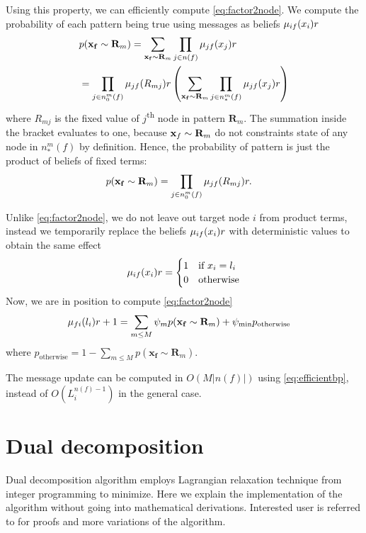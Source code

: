 \documentclass[letterpaper, 10 pt, conference]{ieeeconf} %
\newcommand{\vect}[1]{\mathbf{#1}}
\begin{document}
Using this property, we can efficiently compute \eqref{eq:factor2node}. We
compute the probability of each pattern being true using messages as beliefs
$\msg{i}{f}{x_i}{r}$
\begin{align}
  &p(\vect{x_f} \sim \vect{R}_m) = \sum_{\vect{x_f} \sim \vect{R}_m} \prod_{j \in n(f)}\msg{j}{f}{x_j}{r}\\
  &= \prod_{j \in n^m_0(f)}\msg{j}{f}{R_{mj}}{r}\left(\sum_{\vect{x_f} \sim \vect{R}_m}\prod_{j \in n^m_*(f)}\msg{j}{f}{x_j}{r}\right)
\end{align}
where $R_{mj}$ is the fixed value of $j$\textsuperscript{th} node in pattern
$\vect{R}_m$. The summation inside the bracket evaluates to one, because
$\map_f \sim \vect{R}_m$ do not constraints state of any node in $n^m_*(f)$
by definition. Hence, the probability of pattern is just the product of beliefs
of fixed terms:
\begin{align}
  p(\vect{x_f} \sim \vect{R}_m)&= \prod_{j \in n^m_0(f)}\msg{j}{f}{R_{mj}}{r}.
\end{align}

Unlike \eqref{eq:factor2node}, we do not leave out target node
$i$ from product terms, instead we temporarily replace the beliefs
$\msg{i}{f}{x_i}{r}$ with deterministic values to obtain the same effect
\begin{align}
  \msg{i}{f}{x_i}{r} = \begin{cases}
    1 & \text{if $x_i = l_i$}\\
    0 & \text{otherwise}
  \end{cases}
\end{align}
Now, we are in position to compute \eqref{eq:factor2node}
\begin{align}
  \msg{f}{i}{l_i}{r+1} &= \sum_{m \le M} \psi_m p(\vect{x_f} \sim \vect{R}_m)
  + \psi_{\text{min}} p_{\text{otherwise}}
  \label{eq:efficientbp}
\end{align}
where $p_{\text{otherwise}} = 1 - \sum_{m \le M}p(\vect{x_f} \sim \vect{R}_m)$.

The message update can be computed in $O(M|n(f)|)$ using \eqref{eq:efficientbp}, instead of $O(L_i^{n(f)-1})$ in the general case.

\section{Dual decomposition}
\renewcommand{\msg}[3]{\mu_{#1#2}(#3)}
\newcommand{\assign}{\leftarrow}
\newcommand{\Sx}{L_i}
Dual decomposition algorithm employs Lagrangian relaxation technique from
integer programming to minimize. Here we explain the implementation of the
algorithm without going into mathematical derivations. Interested user is
referred to
\cite{sontag2011introduction,jojic2010accelerated,komodakis2009beyond} for
proofs and more variations of the algorithm. 
\end{document}

